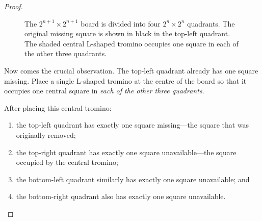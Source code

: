\begin{proof}
\begin{figure}[ht]
\caption{The $2^{n+1}\times2^{n+1}$ board is divided into four
$2^n\times2^n$ quadrants. The original missing square is shown in
black in the top-left quadrant. The shaded central L-shaped tromino
occupies one square in each of the other three quadrants.}
\label{fig:tromino-induction}
\end{figure}

Now comes the crucial observation. The top-left quadrant already has
one square missing. Place a single L-shaped tromino at the centre of
the board so that it occupies one central square in \emph{each of the
other three quadrants}.

After placing this central tromino:

\begin{enumerate}
    \item the top-left quadrant has exactly one square missing---the
          square that was originally removed;
    \item the top-right quadrant has exactly one square unavailable---the
          square occupied by the central tromino;
    \item the bottom-left quadrant similarly has exactly one square
          unavailable; and
    \item the bottom-right quadrant also has exactly one square
          unavailable.
\end{enumerate}


\end{proof}
